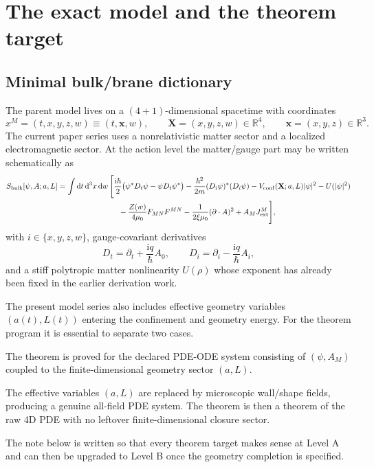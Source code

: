 \documentclass[11pt]{article}
\newcommand{\dd}{\mathrm d}
\newcommand{\ii}{\mathrm i}
\newcommand{\R}{\mathbb R}
\newcommand{\X}{\mathbf X}
\newcommand{\x}{\mathbf x}
\begin{document}
\section{The exact model and the theorem target}
\label{sec:model}

\subsection{Minimal bulk/brane dictionary}

The parent model lives on a $(4+1)$-dimensional spacetime with coordinates
\begin{equation}
  x^{M}=(t,x,y,z,w)\equiv (t,\x,w),
  \qquad
  \X=(x,y,z,w)\in\R^{4},
  \qquad
  \x=(x,y,z)\in\R^{3}.
\end{equation}
The current paper series uses a nonrelativistic matter sector and a localized electromagnetic sector. At the action level the matter/gauge part may be written schematically as
\begin{align}
S_{\rm bulk}[\psi,A;a,L]
&=
\int \dd t\,\dd^{3}x\,\dd w\,
\Bigg[
\frac{\ii\hbar}{2}\big(\psi^{\ast}D_{t}\psi-\psi D_{t}\psi^{\ast}\big)
-\frac{\hbar^{2}}{2m}(D_{i}\psi)^{\ast}(D_{i}\psi)
- V_{\rm conf}(\X;a,L)|\psi|^{2}
- U(|\psi|^{2})
\nonumber\\
&\hspace{8em}
-\frac{Z(w)}{4\mu_{0}}F_{MN}F^{MN}
-\frac{1}{2\xi\mu_{0}}(\partial\cdot A)^{2}
+ A_{M}J^{M}_{\rm ext}
\Bigg],
\label{eq:schematic_action}
\end{align}
with $i\in\{x,y,z,w\}$, gauge-covariant derivatives
\begin{equation}
D_{t}=\partial_{t}+\frac{\ii q}{\hbar}A_{0},
\qquad
D_{i}=\partial_{i}-\frac{\ii q}{\hbar}A_{i},
\end{equation}
and a stiff polytropic matter nonlinearity $U(\rho)$ whose exponent has already been fixed in the earlier derivation work.

The present model series also includes effective geometry variables $(a(t),L(t))$ entering the confinement and geometry energy. For the theorem program it is essential to separate two cases.
\begin{description}[leftmargin=1.75em,style=nextline]
  \item[Level A: current explicit model.] The theorem is proved for the declared PDE-ODE system consisting of $(\psi,A_{M})$ coupled to the finite-dimensional geometry sector $(a,L)$.
  \item[Level B: full all-field completion.] The effective variables $(a,L)$ are replaced by microscopic wall/shape fields, producing a genuine all-field PDE system. The theorem is then a theorem of the raw 4D PDE with no leftover finite-dimensional closure sector.
\end{description}
The note below is written so that every theorem target makes sense at Level A and can then be upgraded to Level B once the geometry completion is specified.
\end{document}
